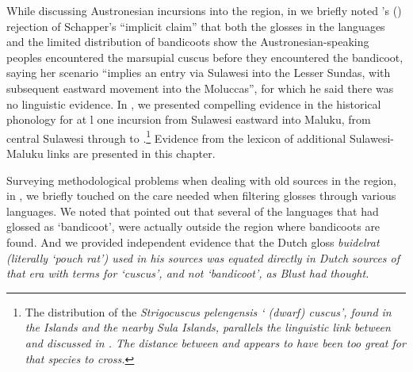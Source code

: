 While discussing Austronesian incursions into the region,
in  we briefly noted \citeauthor{Blust2012b}'s (\citeyear[74]{Blust2012b}) rejection
of Schapper's “implicit claim” that both the glosses in the languages
and the limited distribution of bandicoots show the Austronesian-speaking
peoples encountered the marsupial cuscus before they encountered
the bandicoot, saying her scenario “implies an entry via Sulawesi into the Lesser
Sundas, with subsequent eastward movement into the Moluccas”,
for which he said there was no linguistic evidence.
In , we presented compelling evidence in the historical
phonology for at l one incursion from Sulawesi eastward into
Maluku, from central Sulawesi through  to .\footnote{
		The distribution of the \it{Strigocuscus pelengensis} ‘
		(dwarf) cuscus’, found in the  Islands
		and the nearby Sula Islands,
		parallels the linguistic link between 
		and  discussed in .
		The distance between 
		and  appears to have been too great for that species to cross.}
 Evidence from the lexicon of additional Sulawesi-Maluku links
are presented in this chapter.

Surveying methodological problems when dealing with old sources
in the region, in , we briefly touched on the care needed when
filtering glosses through various languages.
We noted that \citet{Schapper2011} pointed out that several of
the languages that \citet{Blust1982} had glossed as ‘bandicoot’,
were actually outside the region where bandicoots are found.
And we provided independent evidence that the Dutch gloss \it{buidelrat}
(literally ‘pouch rat’) used in his sources was equated directly
in Dutch sources of that era with  terms for ‘cuscus’,
and not ‘bandicoot’, as Blust had thought.

